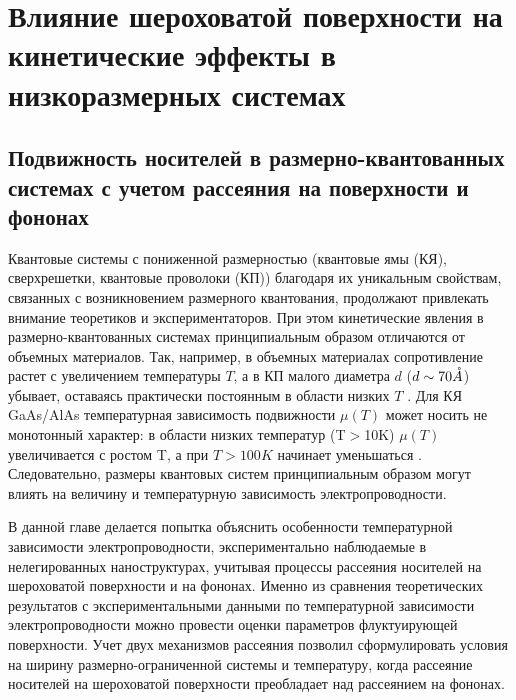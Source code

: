 \chapter{Влияние шероховатой поверхности на кинетические эффекты в низкоразмерных системах} \label{chapt3}

\section{ Подвижность носителей в размерно-квантованных системах с учетом рассеяния на поверхности и фононах}

Квантовые системы с пониженной размерностью (квантовые ямы (КЯ), сверхрешетки, квантовые проволоки (КП)) благодаря их уникальным свойствам, связанных с возникновением размерного квантования, продолжают привлекать внимание теоретиков и экспериментаторов. При этом кинетические явления в размерно-квантованных системах принципиальным образом отличаются от объемных материалов. Так, например, в объемных материалах сопротивление растет с увеличением температуры $T$, а в КП малого диаметра $d$ ($d \sim 70 \AA$) убывает, оставаясь практически постоянным в области низких $T$ \cite{Lin2000,Lin2003,Heremans1998,Zhang2000,Heremans2000}. Для КЯ GaAs/AlAs температурная зависимость подвижности $\mu (T)$ может носить не монотонный характер: в области низких температур (T$>$10K) $\mu (T)$ увеличивается с ростом T, а при $T>100K$ начинает уменьшаться \cite{Lin2000,Sakaki1987}. Следовательно, размеры квантовых систем принципиальным образом могут влиять на величину и температурную зависимость электропроводности.

В данной главе делается попытка объяснить особенности температурной зависимости электропроводности, экспериментально наблюдаемые в нелегированных наноструктурах, учитывая процессы рассеяния носителей на шероховатой поверхности и на фононах. Именно из сравнения теоретических результатов с экспериментальными данными по температурной зависимости электропроводности можно провести оценки параметров флуктуирующей поверхности. Учет двух механизмов рассеяния позволил сформулировать условия на ширину размерно-ограниченной системы и температуру, когда рассеяние носителей на шероховатой поверхности преобладает над рассеянием на фононах.

